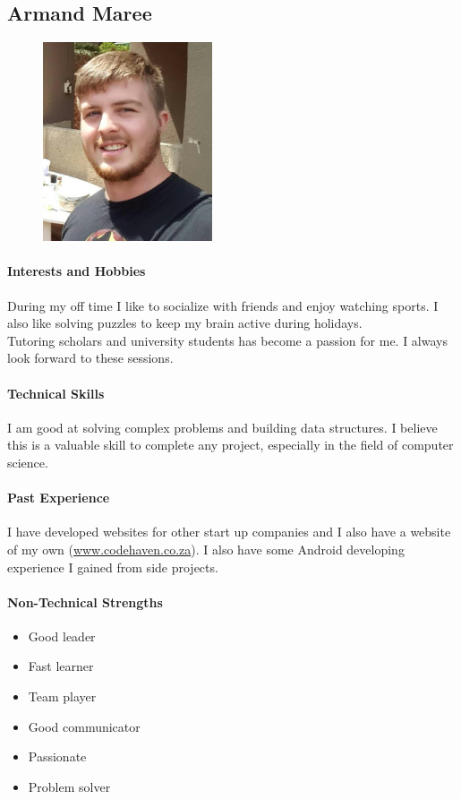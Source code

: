 \documentclass[english]{article}
\begin{document}
		\newpage
		\subsection{Armand Maree}
			\begin{figure}
				\begin{center}
					\includegraphics[width=5cm]{armand.jpg}
				\end{center}
			\end{figure}
			\paragraph{Interests and Hobbies}
			During my off time I like to socialize with friends and enjoy watching sports. I also like solving puzzles to keep my brain active during holidays.\\
			Tutoring scholars and university students has become a passion for me. I always look forward to these sessions.
			
			\paragraph{Technical Skills}
			I am good at solving complex problems and building data structures. I believe this is a valuable skill to complete any project, especially in the field of computer science.
			
			\paragraph{Past Experience}
			I have developed websites for other start up companies and I also have a website of my own (\href{http://www.codehaven.co.za}{www.codehaven.co.za}). I also have some Android developing experience I gained from side projects.
			
			\paragraph{Non-Technical Strengths}
			\begin{itemize}
				\setlength\itemsep{0.2em}
				\item Good leader
				\item Fast learner
				\item Team player
				\item Good communicator
				\item Passionate
				\item Problem solver
			\end{itemize}
			
\end{document}
